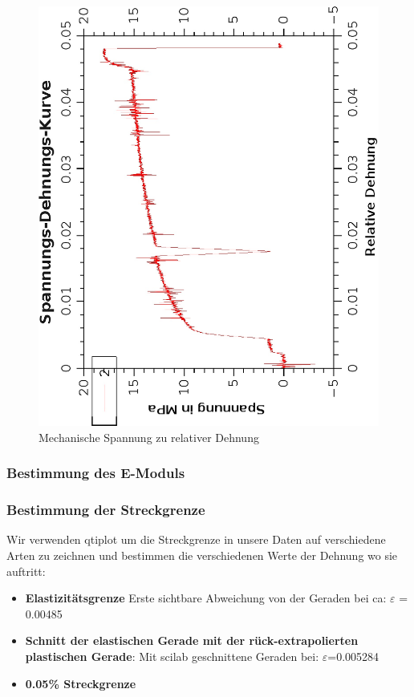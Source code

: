\documentclass{article}
\begin{document}
\begin{center}
\begin{figure}
\caption{Mechanische Spannung zu relativer Dehnung}
\includegraphics[scale=0.7,angle=-90]{spannungsdehnungskurve.eps}
\end{figure}
\end{center}
\subsubsection*{Bestimmung des E-Moduls}
\subsubsection*{Bestimmung der Streckgrenze}
Wir verwenden qtiplot um die Streckgrenze in unsere Daten auf verschiedene Arten zu zeichnen und bestimmen die verschiedenen Werte der Dehnung wo sie auftritt:
\begin{itemize}
\item \textbf{Elastizitätsgrenze} Erste sichtbare Abweichung von der Geraden bei ca: $\varepsilon$ = 0.00485
\item \textbf{Schnitt der elastischen Gerade mit der rück-extrapolierten plastischen Gerade}: Mit scilab geschnittene Geraden bei: $\varepsilon$=0.005284
\item \textbf{0.05\% Streckgrenze}
\end{itemize}
\end{document}
